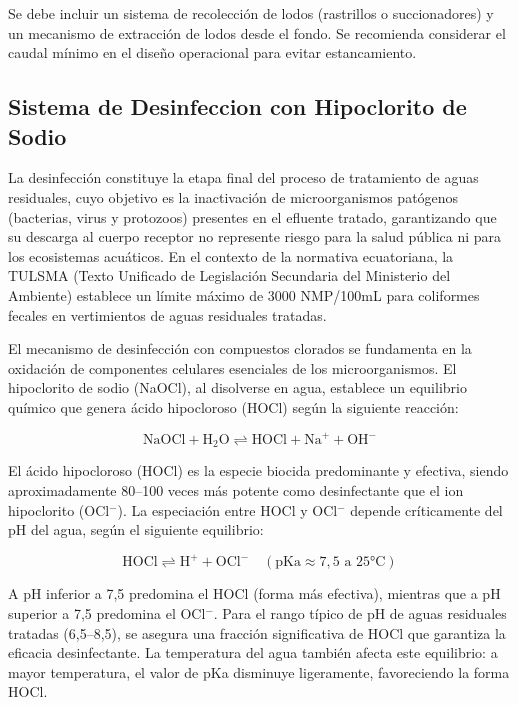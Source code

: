 \documentclass[12pt,a4paper]{article}
\begin{document}
Se debe incluir un sistema de recolección de lodos (rastrillos o succionadores) y un mecanismo de extracción de lodos desde el fondo. Se recomienda considerar el caudal mínimo en el diseño operacional para evitar estancamiento.

\subsection{Sistema de Desinfeccion con Hipoclorito de Sodio}





La desinfección constituye la etapa final del proceso de tratamiento de aguas residuales, cuyo objetivo es la inactivación de microorganismos patógenos (bacterias, virus y protozoos) presentes en el efluente tratado, garantizando que su descarga al cuerpo receptor no represente riesgo para la salud pública ni para los ecosistemas acuáticos. En el contexto de la normativa ecuatoriana, la TULSMA (Texto Unificado de Legislación Secundaria del Ministerio del Ambiente) establece un límite máximo de 3000 NMP/100mL para coliformes fecales en vertimientos de aguas residuales tratadas.

El mecanismo de desinfección con compuestos clorados se fundamenta en la oxidación de componentes celulares esenciales de los microorganismos. El hipoclorito de sodio (NaOCl), al disolverse en agua, establece un equilibrio químico que genera ácido hipocloroso (HOCl) según la siguiente reacción:

\begin{equation}
\text{NaOCl} + \text{H}_2\text{O} \rightleftharpoons \text{HOCl} + \text{Na}^+ + \text{OH}^-
\end{equation}

El ácido hipocloroso (HOCl) es la especie biocida predominante y efectiva, siendo aproximadamente 80--100 veces más potente como desinfectante que el ion hipoclorito (OCl$^-$). La especiación entre HOCl y OCl$^-$ depende críticamente del pH del agua, según el siguiente equilibrio:

\begin{equation}
\text{HOCl} \rightleftharpoons \text{H}^+ + \text{OCl}^- \quad (\text{pKa} \approx 7,5 \text{ a 25°C})
\end{equation}

A pH inferior a 7,5 predomina el HOCl (forma más efectiva), mientras que a pH superior a 7,5 predomina el OCl$^-$. Para el rango típico de pH de aguas residuales tratadas (6,5--8,5), se asegura una fracción significativa de HOCl que garantiza la eficacia desinfectante. La temperatura del agua también afecta este equilibrio: a mayor temperatura, el valor de pKa disminuye ligeramente, favoreciendo la forma HOCl.
\end{document}
